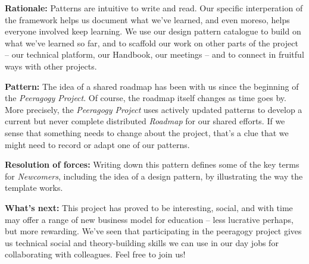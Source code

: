 \textbf{Rationale:}
Patterns are intuitive to write and read.  Our specific interperation of the framework helps us document what we've learned, and even moreso, helps everyone involved keep learning.  We use our design pattern catalogue to build on what we've learned so far, and to scaffold our work on other parts of the project -- our technical platform, our Handbook, our meetings -- and to connect in fruitful ways with other projects.  

\textbf{Pattern:}
The idea of a shared roadmap has been with us since the beginning of the \emph{Peeragogy Project}.  Of course, the roadmap itself changes as time goes by.  More precisely, the \emph{Peeragogy Project} uses actively updated patterns to develop a current but never complete distributed \emph{Roadmap} for our shared efforts.  If we sense that something needs to  change about the project, that’s a clue that we might need to record or adapt one of our patterns. 

\textbf{Resolution of forces:}  
Writing down this pattern defines some of the key terms for \emph{Newcomers}, including the idea of a design pattern, by illustrating the way the template works.

\textbf{What's next:} 
This project has proved to be interesting, social, and with time may offer a range of new business model for education -- less lucrative perhaps, but more rewarding.  We've seen that participating in the peeragogy project gives us technical social and theory-building skills we can use in our day jobs for collaborating with colleagues.  Feel free to join us!